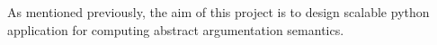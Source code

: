 As mentioned previously, the aim of this project is to design scalable python application for computing abstract argumentation semantics. 